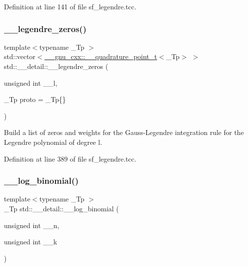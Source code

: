 Definition at line 141 of file sf\+\_\+legendre.\+tcc.

\mbox{\label{namespacestd_1_1____detail_a9d53ac0fd39232190e7564fa067a878d}} 
\subsubsection{\texorpdfstring{\+\_\+\+\_\+legendre\+\_\+zeros()}{\_\_legendre\_zeros()}}
{\footnotesize\ttfamily template$<$typename \+\_\+\+Tp $>$ \\
std\+::vector$<$\hyperlink{struct____gnu__cxx_1_1____quadrature__point__t}{\+\_\+\+\_\+gnu\+\_\+cxx\+::\+\_\+\+\_\+quadrature\+\_\+point\+\_\+t}$<$\+\_\+\+Tp$>$ $>$ std\+::\+\_\+\+\_\+detail\+::\+\_\+\+\_\+legendre\+\_\+zeros (\begin{DoxyParamCaption}\item[{unsigned int}]{\+\_\+\+\_\+l,  }\item[{\+\_\+\+Tp}]{proto = {\ttfamily \+\_\+Tp\{\}} }\end{DoxyParamCaption})}

Build a list of zeros and weights for the Gauss-\/\+Legendre integration rule for the Legendre polynomial of degree {\ttfamily l}. 

Definition at line 389 of file sf\+\_\+legendre.\+tcc.

\mbox{\label{namespacestd_1_1____detail_a087d65f98ba6a6709b4d62fa32445e59}} 
\subsubsection{\texorpdfstring{\+\_\+\+\_\+log\+\_\+binomial()}{\_\_log\_binomial()}\hspace{0.1cm}{\footnotesize\ttfamily [1/2]}}
{\footnotesize\ttfamily template$<$typename \+\_\+\+Tp $>$ \\
\+\_\+\+Tp std\+::\+\_\+\+\_\+detail\+::\+\_\+\+\_\+log\+\_\+binomial (\begin{DoxyParamCaption}\item[{unsigned int}]{\+\_\+\+\_\+n,  }\item[{unsigned int}]{\+\_\+\+\_\+k }\end{DoxyParamCaption})}



